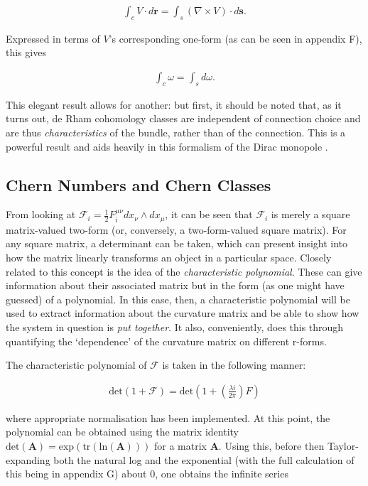 \documentclass[fleqn, twocolumn, 10pt]{article}
\begin{document}
\begin{ceqn}
\begin{align*}
\int_c V\cdot d\mathbf{r} =\int_s (\nabla \times V)\cdot d\mathbf{s}.
\end{align*}
\end{ceqn}
Expressed in terms of $V$'s corresponding one-form (as can be seen in appendix F), this gives

\begin{ceqn}
\begin{align}\tag{15}
\int_c \omega =\int_s d\omega.
\end{align}
\end{ceqn}
This elegant result allows for another: but first, it should be noted that, as it turns out, de Rham cohomology classes are independent of connection choice and are thus \textit{characteristics} of the bundle, rather than of the connection. This is a powerful result and aids heavily in this formalism of the Dirac monopole \cite{nakahara2003geometry, kai2015lam, naber1997topology}.


\subsection{Chern Numbers and Chern Classes}

From looking at $\mathcal{F}_i = \frac{1}{2}F^{\mu\nu}_i dx_\nu \land dx_\mu$, it can be seen that $\mathcal{F}_i$ is merely a square matrix-valued two-form (or, conversely, a two-form-valued square matrix). For any square matrix, a determinant can be taken, which can present insight into how the matrix linearly transforms an object in a particular space. Closely related to this concept is the idea of the \textit{characteristic polynomial}. These can give information about their associated matrix but in the form (as one might have guessed) of a polynomial. In this case, then, a characteristic polynomial will be used to extract information about the curvature matrix and be able to show how the system in question is \textit{put together}. It also, conveniently, does this through quantifying the `dependence' of the curvature matrix on different r-forms.

The characteristic polynomial of $\mathcal{F}$ is taken in the following manner:

\begin{ceqn}
\begin{align*}
\text{det}(1+\mathcal{F}) = \text{det}\left(1+\left(\frac{\lambda i}{2\pi}\right)F\right)
\end{align*}
\end{ceqn}
where appropriate normalisation has been implemented. At this point, the polynomial can be obtained using the matrix identity $\text{det}(\mathbf{A}) = \text{exp}(\text{tr}(\text{ln}(\mathbf{A})))$ for a matrix $\mathbf{A}$. Using this, before then Taylor-expanding both the natural log and the exponential (with the full calculation of this being in appendix G) about $0$, one obtains the infinite series
\end{document}
